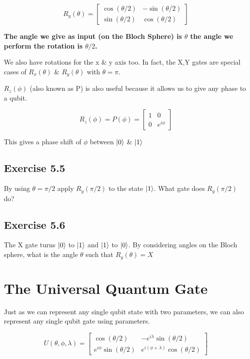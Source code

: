 \documentclass{book}
\begin{document}
$$
R_y(\theta) = \begin{bmatrix} \cos(\theta /2) & -\sin(\theta /2) \\ \sin(\theta /2) & \cos(\theta /2) \end{bmatrix}
$$

\textbf{The angle we give as input (on the Bloch Sphere) is $\theta$ the angle we perform the rotation is $\theta/2$.}

We also have rotations for the x \& y axis too. In fact, the X,Y gates are special cases of $R_x(\theta)$ \& $R_y(\theta)$ with $\theta = \pi$. 

$R_z(\phi)$ (also known as P) is also useful because it allows us to give any phase to a qubit. 

$$
R_z(\phi) = P(\phi) = \begin{bmatrix} 1 & 0 \\ 0 & e^{i\phi} \end{bmatrix}
$$

This gives a phase shift of $\phi$ between $\ket{0}$ \& $\ket{1}$

\hline
\subsection{Exercise 5.5}
By using $\theta = \pi/2$ apply $R_y(\pi/2)$ to the state $\ket{1}$. What gate does $R_y(\pi/2)$ do? 
 
\subsection{Exercise 5.6} 
The X gate turns $\ket{0}$ to $\ket{1}$ and $\ket{1}$ to $\ket{0}$. By considering angles on the Bloch sphere, what is the angle $\theta$ such that $R_y(\theta) = X$
\hline

\section{ The Universal Quantum Gate }

Just as we can represent any single qubit state with two parameters, we can also represent any single qubit gate using parameters. 

$$
U(\theta, \phi, \lambda) = \begin{bmatrix} \cos(\theta/2) & -e^{i\lambda}\sin(\theta/2) \\ e^{i\phi}\sin(\theta/2) & e^{i(\phi + \lambda)}\cos(\theta/2) \end{bmatrix} 
$$
\end{document}
